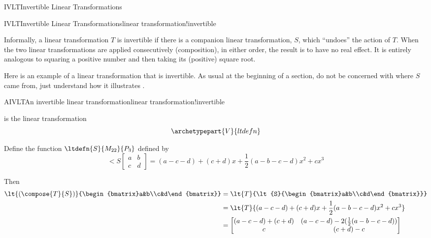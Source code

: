 \begin{subsect}{IVLT}{Invertible Linear Transformations}
\begin{definition}{IVLT}{Invertible Linear Transformations}{linear transformation!invertible}
\end{definition}
%
\begin{para}Informally, a linear transformation $T$ is invertible if there is a companion linear transformation, $S$, which ``undoes'' the action of $T$.  When the two linear transformations are applied consecutively (composition), in either order, the result is to have no real effect.  It is entirely analogous to squaring a positive number and then taking its (positive) square root.\end{para}
%
\begin{para}Here is an example of a linear transformation that is invertible.  As usual at the beginning of a section, do not be concerned with where $S$ came from, just understand how it illustrates .\end{para}
%
\begin{example}{AIVLT}{An invertible linear transformation}{linear transformation!invertible}
\begin{para} is the linear transformation
%
\begin{equation*}
\archetypepart{V}{ltdefn}\end{equation*}
\end{para}
%
\begin{para}Define the function $\ltdefn{S}{M_{22}}{P_3}$ defined by
%
\begin{equation*}
\lt{S}{\begin{bmatrix}a&b\\c&d\end{bmatrix}}=(a - c - d)+ (c + d)x +\frac{1}{2}(a - b - c - d)x^2+cx^3
\end{equation*}
\end{para}
%
\begin{para}Then
%
\begin{align*}
\lt{\left(\compose{T}{S}\right)}{\begin{bmatrix}a&b\\c&d\end{bmatrix}}&=
\lt{T}{\lt{S}{\begin{bmatrix}a&b\\c&d\end{bmatrix}}}\\
%
&=\lt{T}{(a - c - d)+ (c + d)x +\frac{1}{2}(a - b - c - d)x^2+cx^3}\\
&=\begin{bmatrix}
(a - c - d)+ (c + d)&(a - c - d)-2(\frac{1}{2}(a - b - c - d))\\c&(c + d)-c

\end{bmatrix}
\end{align*}
\end{para}
\end{example}
\end{subsect}
